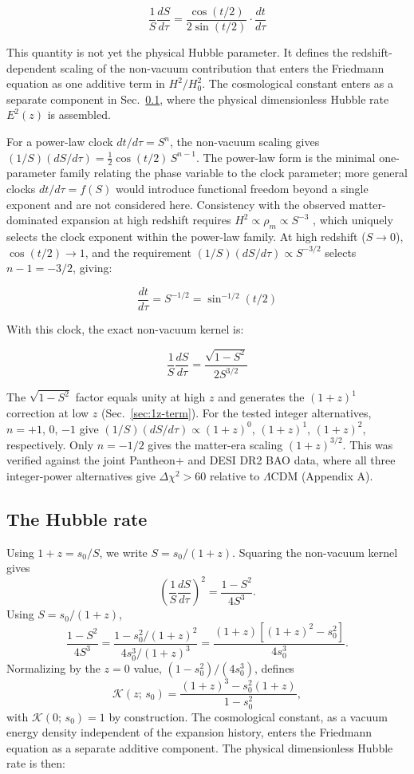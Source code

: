 \documentclass[
  aps,
  prd,
  onecolumn,         %
  nofootinbib,
  longbibliography
]{revtex4-2}
\begin{document}
\[\frac{1}{S}\frac{dS}{d\tau} = \frac{\cos(t/2)}{2\sin(t/2)} \cdot \frac{dt}{d\tau}\]

This quantity is not yet the physical Hubble parameter. It defines the
redshift-dependent scaling of the non-vacuum contribution that enters the
Friedmann equation as one additive term in $H^2/H_0^2$. The cosmological
constant enters as a separate component in Sec.~\ref{sec:hubble}, where the
physical dimensionless Hubble rate $E^2(z)$ is assembled.

\pagebreak

For a power-law clock $dt/d\tau = S^n$, the non-vacuum scaling gives
$(1/S)(dS/d\tau) = \tfrac{1}{2}\cos(t/2)\,S^{n-1}$. The power-law form is the minimal
one-parameter family relating the phase variable to the clock parameter; more general clocks
$dt/d\tau = f(S)$ would introduce functional freedom beyond a single exponent
and are not considered here. Consistency with the observed
matter-dominated expansion at high redshift requires $H^2 \propto \rho_m \propto S^{-3}$
\cite{ref15}, which uniquely selects the clock exponent within the
power-law family. At high
redshift ($S \to 0$), $\cos(t/2) \to 1$, and the requirement $(1/S)(dS/d\tau) \propto S^{-3/2}$
selects $n - 1 = -3/2$, giving:

\[\frac{dt}{d\tau} = S^{-1/2} = \sin^{-1/2}(t/2)\]

With this clock, the exact non-vacuum kernel is:

\[\frac{1}{S}\frac{dS}{d\tau} = \frac{\sqrt{1 - S^2}}{2S^{3/2}}\]

The $\sqrt{1-S^2}$ factor equals unity at high $z$ and generates the $(1+z)^1$
correction at low $z$ (Sec.~\ref{sec:1z-term}). For the tested integer alternatives, $n = +1$,
$0$, $-1$ give $(1/S)(dS/d\tau) \propto (1+z)^0$, $(1+z)^1$, $(1+z)^2$, respectively. Only $n =
-1/2$ gives the matter-era scaling $(1+z)^{3/2}$. This was verified against
the joint Pantheon+ and DESI DR2 BAO data, where all three integer-power
alternatives give $\Delta\chi^2 > 60$ relative to $\Lambda$CDM (Appendix A).

\subsection{The Hubble rate}\label{sec:hubble}

Using $1 + z = s_0/S$, we write $S = s_0/(1+z)$. Squaring the non-vacuum
kernel gives
\[
\left(\frac{1}{S}\frac{dS}{d\tau}\right)^2
= \frac{1-S^2}{4S^3}.
\]
Using $S=s_0/(1+z)$,
\[
\frac{1-S^2}{4S^3}
=
\frac{1-s_0^2/(1+z)^2}{4s_0^3/(1+z)^3}
=
\frac{(1+z)\left[(1+z)^2-s_0^2\right]}{4s_0^3}.
\]
Normalizing by the $z=0$ value, $(1-s_0^2)/(4s_0^3)$, defines
\[
\mathcal{K}(z;\,s_0)
=
\frac{(1+z)^3-s_0^2(1+z)}{1-s_0^2},
\]
with $\mathcal{K}(0;\,s_0) = 1$ by construction. The
cosmological constant, as a vacuum energy density independent of the
expansion history, enters the Friedmann equation \cite{ref15} as a separate
additive component. The physical dimensionless Hubble rate is then:
\end{document}

